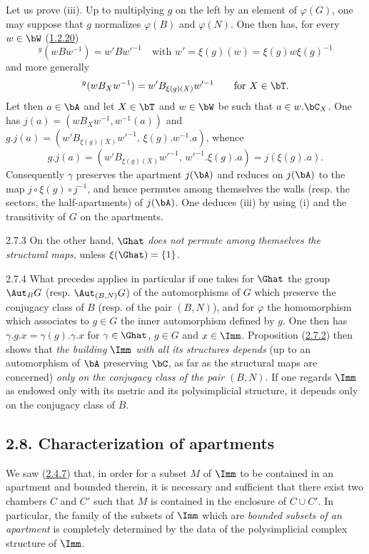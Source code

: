 \documentclass[12pt,a4paper,oneside,english]{smfart}
\makeatletter
\newcommand{\btanchor}[1]{\leavevmode\Hy@raisedlink{\hypertarget{bt:#1}{}}}
\newcommand{\btref}[1]{\hyperlink{bt:#1}{#1}}
\newcommand{\btsecB}[2]{%
  \par\needspace{4\baselineskip}\phantomsection
  \subsection*{#2}%
  \ifx\relax#1\relax\else\btanchor{#1}\fi}
\theoremstyle{definition}
\theoremstyle{bt}
\makeatother
\begin{document}
Let us prove (iii). Up to multiplying $g$ on the left by an element of
$\varphi(G)$, one may suppose that $g$ normalizes $\varphi(B)$ and
$\varphi(N)$. One then has, for every $w\in\bW$ (\btref{1.2.20})
\[
{}^{g}(wBw^{-1})=w'Bw'^{-1}\quad\text{with }w'=\xi(g)(w)=\xi(g)w\xi(g)^{-1}
\]
and more generally
\[
{}^{g}(wB_Xw^{-1})=w'B_{\xi(g)(X)}w'^{-1}\qquad\text{for }X\in\bT.
\]
Let then $a\in\bA$ and let $X\in\bT$ and $w\in\bW$ be such that
$a\in w.\bC_X$. One has $j(a)=(wB_Xw^{-1},w^{-1}(a))$ and
$g.j(a)=(w'B_{\xi(g)(X)}w'^{-1},\,\xi(g).w^{-1}.a)$, whence
\[
g.j(a)=(w'B_{\xi(g)(X)}w'^{-1},\,w'^{-1}.\xi(g).a)=j(\xi(g).a).
\]
Consequently $\gamma$ preserves the apartment $j(\bA)$ and reduces on
$j(\bA)$ to the map $j\circ\xi(g)\circ j^{-1}$, and hence permutes among
themselves the walls (resp. the sectors, the half-apartments) of $j(\bA)$. One
deduces (iii) by using (i) and the transitivity of $G$ on the apartments.

\num{2.7.3}\btanchor{2.7.3}
On the other hand, $\Ghat$ \emph{does not permute among themselves the
structural maps}, unless $\xi(\Ghat)=\{1\}$.

\num{2.7.4}\btanchor{2.7.4}
What precedes applies in particular if one takes for $\Ghat$ the group
$\Aut_B G$ (resp. $\Aut_{(B,N)}G$) of the automorphisms of $G$ which preserve
the conjugacy class of $B$ (resp. of the pair $(B,N)$), and for $\varphi$ the
homomorphism which associates to $g\in G$ the inner automorphism defined by
$g$. One then has $\gamma.g.x=\gamma(g).\gamma.x$ for $\gamma\in\Ghat$,
$g\in G$ and $x\in\Imm$. Proposition (\btref{2.7.2}) then shows that \emph{the
building $\Imm$ with all its structures depends} (up to an automorphism of
$\bA$ preserving $\bC$, as far as the structural maps are concerned)
\emph{only on the conjugacy class of the pair $(B,N)$}. If one regards $\Imm$
as endowed only with its metric and its polysimplicial structure, it depends
only on the conjugacy class of $B$.


\btsecB{2.8}{2.8. Characterization of apartments}


We saw (\btref{2.4.7}) that, in order for a subset $M$ of $\Imm$ to be contained in an
apartment and bounded therein, it is necessary and sufficient that there exist
two chambers $C$ and $C'$ such that $M$ is contained in the enclosure of
$C\cup C'$. In particular, the family of the subsets of $\Imm$ which are
\emph{bounded subsets of an apartment} is completely determined by the data of
the polysimplicial complex structure of $\Imm$.
\end{document}
